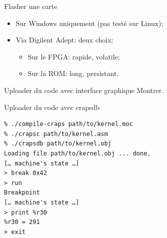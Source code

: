 \documentclass{beamer}
\begin{document}
    \begin{frame}{Flasher une carte}
      \begin{itemize}
        \item Sur Windows uniquement (pas testé sur Linux);
        \item Via Digilent Adept: deux choix:
          \begin{itemize}
            \item Sur le FPGA: rapide, volatile;
            \item Sur la ROM: long, persistant.
          \end{itemize}
      \end{itemize}
    \end{frame}

    \begin{frame}{Uploader du code avec interface graphique}
      Montrer.
    \end{frame}

    \begin{frame}[fragile]{Uploader du code avec crapsdb}
      \begin{verbatim}
% ./compile-craps path/to/kernel.moc
% ./crapsc path/to/kernel.asm
% ./crapsdb path/to/kernel.obj
Loading file path/to/kernel.obj ... done.
[… machine's state …]
> break 0x42
> run
Breakpoint
[… machine's state …]
> print %r30
%r30 = 291
> exit
      \end{verbatim}
\end{frame}
\end{document}
